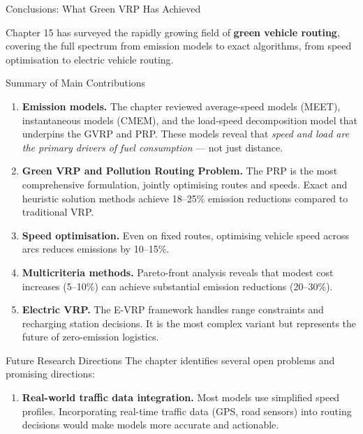 \documentclass[aspectratio=169,10pt]{beamer}
\begin{document}
\begin{frame}[allowframebreaks]{Conclusions: What Green VRP Has Achieved}

  Chapter 15 has surveyed the rapidly growing field of \textbf{green vehicle
  routing}, covering the full spectrum from emission models to exact
  algorithms, from speed optimisation to electric vehicle routing.

  \begin{block}{Summary of Main Contributions}
    \begin{enumerate}
      \item \textbf{Emission models.}  The chapter reviewed average-speed models
      (MEET), instantaneous models (CMEM), and the load-speed decomposition
      model that underpins the GVRP and PRP.  These models reveal that
      \emph{speed and load are the primary drivers of fuel consumption} ---
      not just distance.

      \item \textbf{Green VRP and Pollution Routing Problem.}  The PRP is the
      most comprehensive formulation, jointly optimising routes and speeds.
      Exact and heuristic solution methods achieve 18--25\% emission reductions
      compared to traditional VRP.

      \item \textbf{Speed optimisation.}  Even on fixed routes, optimising
      vehicle speed across arcs reduces emissions by 10--15\%.

      \item \textbf{Multicriteria methods.}  Pareto-front analysis reveals
      that modest cost increases (5--10\%) can achieve substantial emission
      reductions (20--30\%).

      \item \textbf{Electric VRP.}  The E-VRP framework handles range
      constraints and recharging station decisions.  It is the most complex
      variant but represents the future of zero-emission logistics.
    \end{enumerate}
  \end{block}

  \framebreak

  \begin{block}{Future Research Directions}
    The chapter identifies several open problems and promising directions:
    \begin{enumerate}
      \item \textbf{Real-world traffic data integration.}  Most models use
      simplified speed profiles.  Incorporating real-time traffic data
      (GPS, road sensors) into routing decisions would make models more
      accurate and actionable.


\end{enumerate}
\end{block}
\end{frame}
\end{document}
